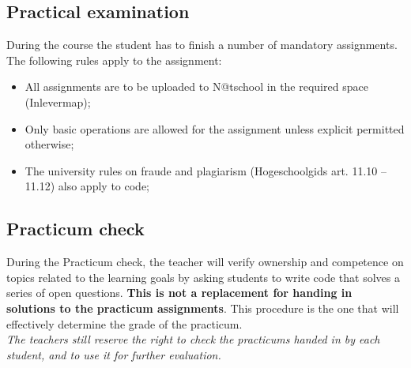 \subsection{Practical examination \modulecode}
During the course the student has to finish a number of mandatory assignments. 
The following rules apply to the assignment:
\begin{itemize}
  \item All assignments are to be uploaded to N@tschool in the required space (Inlevermap);
  \item Only basic operations are allowed for the assignment unless explicit permitted otherwise;
  \item The university rules on fraude and plagiarism (Hogeschoolgids art. 11.10 -- 11.12) also apply to code;
\end{itemize}



\subsection{Practicum check \modulecode}
During the Practicum check, the teacher will verify ownership and competence on topics related to the learning goals by asking students to write code that solves a series of open questions. \textbf{This is not a replacement for handing in solutions to the practicum assignments}. This procedure is the one that will effectively determine the grade of the practicum. \\

\textit{The teachers still reserve the right to check the practicums handed in by each student, and to use it for further evaluation.}

